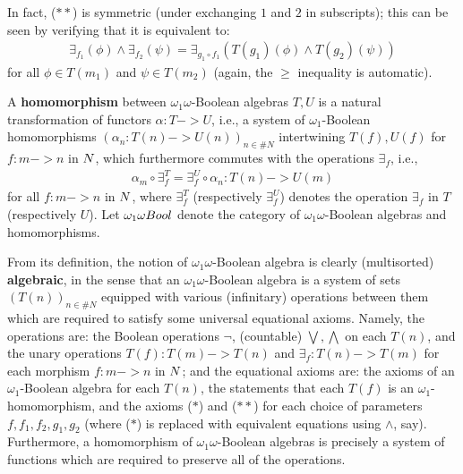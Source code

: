 \documentclass[11pt]{article}
\newcommand*\defn{\textbf}
\begin{document}
\begin{remark}
In fact, ($**$) is symmetric (under exchanging $1$ and $2$ in subscripts); this can be seen by verifying that it is equivalent to:
\begin{align*}
\exists_{f_1}(\phi) \wedge \exists_{f_2}(\psi) = \exists_{g_1 \circ f_1}(T(g_1)(\phi) \wedge T(g_2)(\psi))
\end{align*}
for all $\phi \in T(m_1)$ and $\psi \in T(m_2)$ (again, the $\ge$ inequality is automatic).
\end{remark}

A \defn{homomorphism} between $\omega_1\omega$-Boolean algebras $T, U$ is a natural transformation of functors $\alpha : T -> U$, i.e., a system of $\omega_1$-Boolean homomorphisms $(\alpha_n : T(n) -> U(n))_{n \in \#N}$ intertwining $T(f), U(f)$ for $f : m -> n$ in $\*N$, which furthermore commutes with the operations $\exists_f$, i.e.,
\begin{align*}
\alpha_m \circ \exists_f^T = \exists_f^U \circ \alpha_n : T(n) -> U(m)
\end{align*}
for all $f : m -> n$ in $\*N$, where $\exists_f^T$ (respectively $\exists_f^U$) denotes the operation $\exists_f$ in $T$ (respectively $U$).  Let $\*{\omega_1\omega Bool}$ denote the category of $\omega_1\omega$-Boolean algebras and homomorphisms.

From its definition, the notion of $\omega_1\omega$-Boolean algebra is clearly (multisorted) \defn{algebraic}, in the sense that an $\omega_1\omega$-Boolean algebra is a system of sets $(T(n))_{n \in \#N}$ equipped with various (infinitary) operations between them which are required to satisfy some universal equational axioms.  Namely, the operations are: the Boolean operations $\neg$, (countable) $\bigvee, \bigwedge$ on each $T(n)$, and the unary operations $T(f) : T(m) -> T(n)$ and $\exists_f : T(n) -> T(m)$ for each morphism $f : m -> n$ in $\*N$; and the equational axioms are: the axioms of an $\omega_1$-Boolean algebra for each $T(n)$, the statements that each $T(f)$ is an $\omega_1$-homomorphism, and the axioms ($*$) and ($**$) for each choice of parameters $f, f_1, f_2, g_1, g_2$ (where ($*$) is replaced with equivalent equations using $\wedge$, say).  Furthermore, a homomorphism of $\omega_1\omega$-Boolean algebras is precisely a system of functions which are required to preserve all of the operations.
\end{document}
